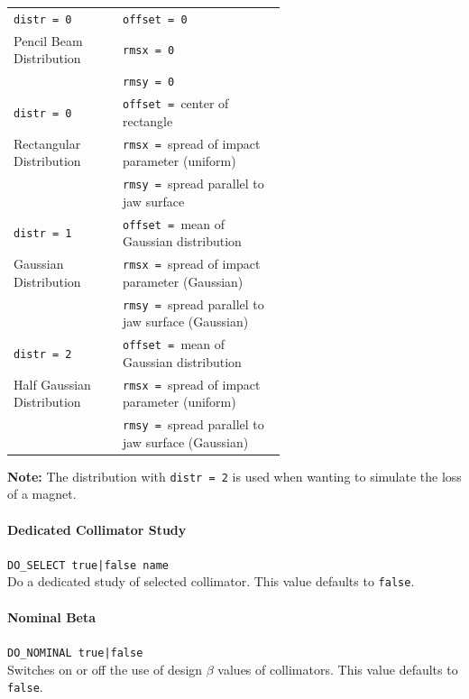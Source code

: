 \bigskip
\begin{tabular}{@{}l|p{0.6\linewidth}}
    \texttt{distr = 0}         & \texttt{offset = 0} \\
    Pencil Beam Distribution   & \texttt{rmsx   = 0} \\
                               & \texttt{rmsy   = 0} \\
    \hline
    \texttt{distr = 0}         & \texttt{offset = }center of rectangle \\
    Rectangular Distribution   & \texttt{rmsx   = }spread of impact parameter (uniform) \\
                               & \texttt{rmsy   = }spread parallel to jaw surface \\
    \hline
    \texttt{distr = 1}         & \texttt{offset = }mean of Gaussian distribution \\
    Gaussian Distribution      & \texttt{rmsx   = }spread of impact parameter (Gaussian) \\
                               & \texttt{rmsy   = }spread parallel to jaw surface (Gaussian) \\
    \hline
    \texttt{distr = 2}         & \texttt{offset = }mean of Gaussian distribution \\
    Half Gaussian Distribution & \texttt{rmsx   = }spread of impact parameter (uniform) \\
                               & \texttt{rmsy   = }spread parallel to jaw surface (Gaussian) \\
\end{tabular}

\bigskip
\noindent\textbf{Note:} The distribution with \texttt{distr = 2} is used when wanting to simulate the loss of a magnet.

\paragraph{Dedicated Collimator Study} \texttt{DO\_SELECT true|false name}\\

Do a dedicated study of selected collimator.
This value defaults to \texttt{false}.

\paragraph{Nominal Beta} \texttt{DO\_NOMINAL true|false}\\

Switches on or off the use of design $\beta$ values of collimators.
This value defaults to \texttt{false}.

